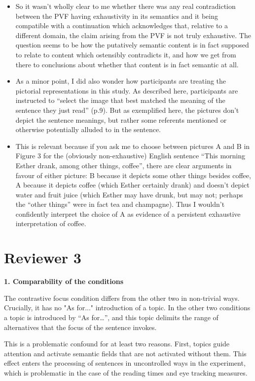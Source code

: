 \documentclass[a4paper, ruler]{CUP-JNL-LIN}%
\begin{document}
\begin{itemize}
  \item So it wasn't wholly clear to me whether there was any real contradiction between the PVF having exhaustivity in its semantics and it being compatible with a continuation which acknowledges that, relative to a different domain, the claim arising from the PVF is not truly exhaustive. The question seems to be how the putatively semantic content is in fact supposed to relate to content which ostensibly contradicts it, and how we get from there to conclusions about whether that content is in fact semantic at all.
  \item As a minor point, I did also wonder how participants are treating the pictorial representations in this study. As described here, participants are instructed to ``select the image that best matched the meaning of the sentence they just read'' (p.9). But as exemplified here, the pictures don't depict the sentence meanings, but rather some referents mentioned or otherwise potentially alluded to in the sentence.
  \item This is relevant because if you ask me to choose between pictures A and B in Figure 3 for the (obviously non-exhaustive) English sentence ``This morning Esther drank, among other things, coffee'', there are clear arguments in favour of either picture: B because it depicts some other things besides coffee, A because it depicts coffee (which Esther certainly drank) and doesn't depict water and fruit juice (which Esther may have drunk, but may not; perhaps the ``other things'' were in fact tea and champagne). Thus I wouldn't confidently interpret the choice of A as evidence of a persistent exhaustive interpretation of coffee.
\end{itemize}

\section{Reviewer 3}

\textbf{1. Comparability of the conditions}

The contrastive focus condition differs from the other two in non-trivial ways. Crucially, it has no "As for..." introduction of a topic. In the other two conditions a topic is introduced by “As for…”, and this topic delimits the range of alternatives that the focus of the sentence invokes.

This is a problematic confound for at least two reasons. First, topics guide attention and activate semantic fields that are not activated without them. This effect enters the processing of sentences in uncontrolled ways in the experiment, which is problematic in the case of the reading times and eye tracking measures.
\end{document}
